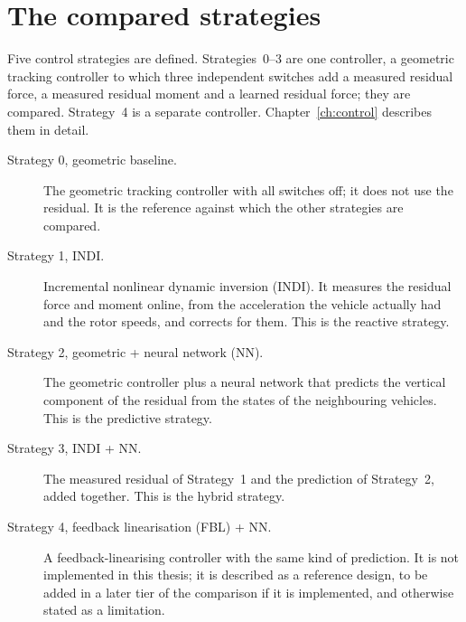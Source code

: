 \section{The compared strategies}
\label{sec:intro-strategies}

Five control strategies are defined. Strategies~0--3 are one controller, a geometric tracking
controller to which three independent switches add a measured residual force, a measured residual
moment and a learned residual force; they are compared. Strategy~4 is a separate controller.
Chapter~\ref{ch:control} describes them in detail.

\begin{description}
  \item[Strategy 0, geometric baseline.] The geometric tracking controller with all switches off;
    it does not use the residual. It is the reference against which the other strategies are
    compared.
  \item[Strategy 1, INDI.] Incremental nonlinear dynamic inversion (INDI). It measures the residual
    force and moment online, from the acceleration the vehicle actually had and the rotor speeds,
    and corrects for them. This is the reactive strategy.
  \item[Strategy 2, geometric + neural network (NN).] The geometric controller plus a neural network
    that predicts the vertical component of the residual from the states of the neighbouring
    vehicles. This is the predictive strategy.
  \item[Strategy 3, INDI + NN.] The measured residual of Strategy~1 and the prediction of
    Strategy~2, added together. This is the hybrid strategy.
  \item[Strategy 4, feedback linearisation (FBL) + NN.] A feedback-linearising controller with the
    same kind of prediction. It is not implemented in this thesis; it is described as a reference
    design, to be added in a later tier of the comparison if it is implemented, and otherwise
    stated as a limitation.
\end{description}

